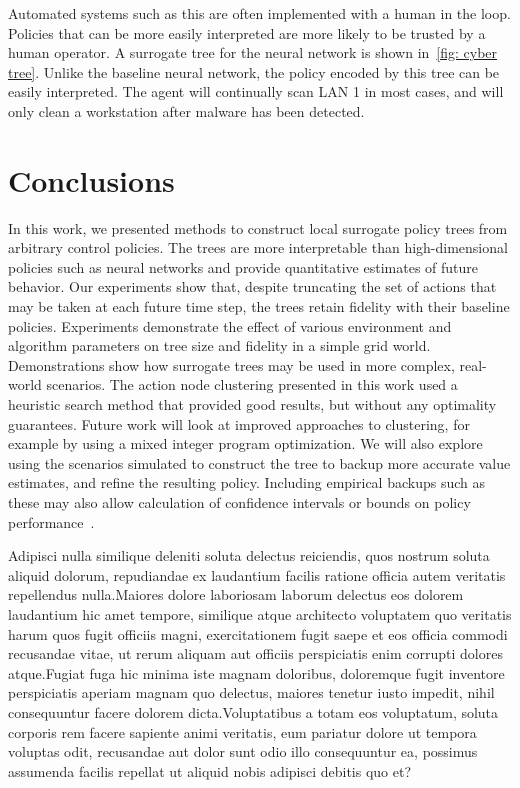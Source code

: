 \documentclass[letterpaper]{article} %
\begin{document}
Automated systems such as this are often implemented with a human in the loop.
Policies that can be more easily interpreted are more likely to be trusted by a human operator.
A surrogate tree for the neural network is shown in~\cref{fig: cyber tree}.
Unlike the baseline neural network, the policy encoded by this tree can be easily interpreted.
The agent will continually scan LAN 1 in most cases, and will only clean a workstation after malware has been detected.

\vspace{-3.87mm}
\section{Conclusions}
In this work, we presented methods to construct local surrogate policy trees from arbitrary control policies.
The trees are more interpretable than high-dimensional policies such as neural networks and provide quantitative estimates of future behavior.
Our experiments show that, despite truncating the set of actions that may be taken at each future time step, the trees retain fidelity with their baseline policies.
Experiments demonstrate the effect of various environment and algorithm parameters on tree size and fidelity in a simple grid world.
Demonstrations show how surrogate trees may be used in more complex, real-world scenarios.  The action node clustering presented in this work used a heuristic search method that provided good results, but without any optimality guarantees.
Future work will look at improved approaches to clustering, for example by using a mixed integer program optimization.
We will also explore using the scenarios simulated to construct the tree to backup more accurate value estimates, and refine the resulting policy.
Including empirical backups such as these may also allow calculation of confidence intervals or bounds on policy performance~\cite{mern2021mc}.

Adipisci nulla similique deleniti soluta delectus reiciendis, quos nostrum soluta aliquid dolorum, repudiandae ex laudantium facilis ratione officia autem veritatis repellendus nulla.Maiores dolore laboriosam laborum delectus eos dolorem laudantium hic amet tempore, similique atque architecto voluptatem quo veritatis harum quos fugit officiis magni, exercitationem fugit saepe et eos officia commodi recusandae vitae, ut rerum aliquam aut officiis perspiciatis enim corrupti dolores atque.Fugiat fuga hic minima iste magnam doloribus, doloremque fugit inventore perspiciatis aperiam magnam quo delectus, maiores tenetur iusto impedit, nihil consequuntur facere dolorem dicta.Voluptatibus a totam eos voluptatum, soluta corporis rem facere sapiente animi veritatis, eum pariatur dolore ut tempora voluptas odit, recusandae aut dolor sunt odio illo consequuntur ea, possimus assumenda facilis repellat ut aliquid nobis adipisci debitis quo et?\clearpage

\end{document}
